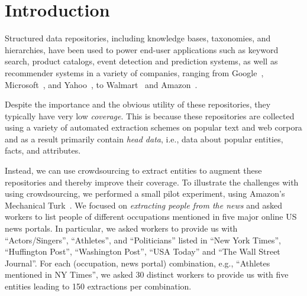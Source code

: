 


\section{Introduction}
\label{sec:intro}


Structured data repositories, including knowledge bases, taxonomies, and hierarchies, 
have been used to power end-user applications such as keyword search,
product catalogs, event detection and prediction systems,
as well as recommender systems in a variety of companies,
ranging from Google~\cite{singhal2012introducing}, Microsoft~\cite{cheng2010fuzzy}, and Yahoo~\cite{woo}, to 
Walmart~\cite{Deshpande:2013:BMU:2463676.2465297} and Amazon~\cite{amazon-product}.

Despite the importance and the obvious utility of these repositories,
they typically have very low {\em coverage}.
This is because these repositories are collected using a variety
of automated extraction schemes on popular text and web corpora and as a result 
primarily contain {\em head data}, i.e., data about popular entities,
facts, and attributes.

Instead, we can use crowdsourcing to extract entities to 
augment these repositories and thereby improve their coverage. 
To illustrate the challenges with using crowdsourcing, we performed a
small pilot experiment, using Amazon's Mechanical Turk~\cite{mturk}.
We focused on {\em extracting people from the news} and asked workers to list 
people of different occupations mentioned in five major online US news portals. 
In particular, we asked workers to provide us with ``Actors/Singers'', ``Athletes'', and ``Politicians'' 
listed in ``New York Times'', ``Huffington Post'', ``Washington Post'', ``USA  Today'' and 
``The Wall Street Journal''. For each (occupation, news portal) combination, e.g., ``Athletes mentioned in NY Times'', 
we asked 30 distinct workers to provide us with five entities leading to 150 extractions per combination.

